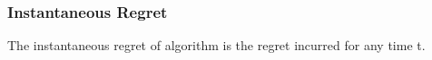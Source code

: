 


\subsubsection{Instantaneous Regret}
\label{sec:ra_ir}
The instantaneous regret of algorithm is the regret incurred for any time t. 

